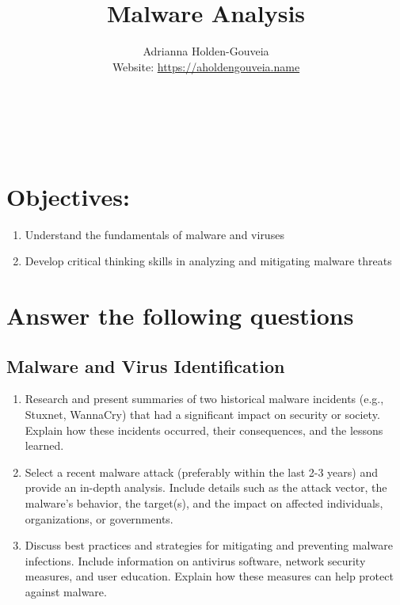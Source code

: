 \documentclass[12pt]{article}
\title{Malware Analysis}
\author{
        Adrianna Holden-Gouveia \\
        Website: \url{https://aholdengouveia.name}\\ 
        \date{\vspace{-5ex}}
        \faLinkedin{: aholdengouveia} \\
        \faGithub {: aholdengouveia} \\
        \faTwitter {: aholdengouveia} \\
        }
\begin{document}
    

\maketitle


\section*{Objectives:}
\begin{enumerate}
    \item Understand the fundamentals of malware and viruses
    \item Develop critical thinking skills in analyzing and mitigating malware threats
\end{enumerate}
\section*{Answer the following questions}


\subsection*{Malware and Virus Identification }
    \begin{enumerate}
        \item Research and present summaries of two historical malware incidents (e.g., Stuxnet, WannaCry) that had a significant impact on security or society. Explain how these incidents occurred, their consequences, and the lessons learned.
        \item Select a recent malware attack (preferably within the last 2-3 years) and provide an in-depth analysis. Include details such as the attack vector, the malware's behavior, the target(s), and the impact on affected individuals, organizations, or governments.
        \item Discuss best practices and strategies for mitigating and preventing malware infections. Include information on antivirus software, network security measures, and user education. Explain how these measures can help protect against malware.


    \end{enumerate}
\end{document}
